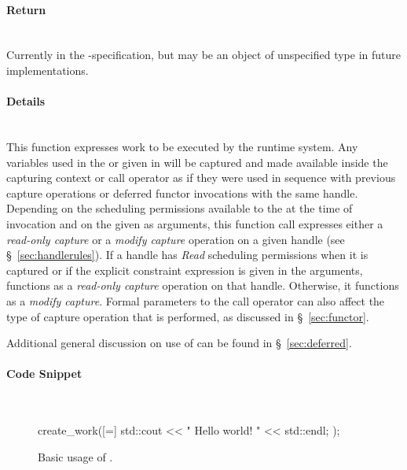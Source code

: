 \paragraph{Return}\mbox{}\\
Currently  in the \specVersion-specification, but may be an object of unspecified
type in future implementations.

\paragraph{Details}\mbox{}\\
This function expresses work to be executed by the \gls{runtime system}.  Any
 variables used in the  or
given in  will be captured and made available
inside the capturing context or  call operator as if
they were used in sequence with previous capture operations or deferred functor
invocations with the same \gls{handle}.  Depending on the scheduling permissions
available to the  at the time of
 invocation and on the 
given as arguments, this function call expresses either a {\it read-only
capture} or a {\it modify capture} operation on a given \gls{handle} (see
\S~\ref{sec:handlerules}).  If a \gls{handle}  has {\it Read} scheduling
permissions when it is captured or if the explicit constraint expression
 is given in the  arguments,
 functions as a {\it read-only capture} operation on that
\gls{handle}.
Otherwise, it functions as a {\it modify capture}.  Formal parameters to the
 call operator can also affect the type of capture
operation that is performed, as discussed in \S~\ref{sec:functor}.

Additional general discussion on use of  can be found in
\S~\ref{sec:deferred}.


\paragraph{Code Snippet}\mbox{}\\
\begin{figure}[!h]
\begin{CppCodeNumb}
create_work([=]{
  std::cout << " Hello world! " << std::endl;
});
\end{CppCodeNumb}
\label{fig:fe_api_cw}
  \caption{Basic usage of \protect{}.}
\end{figure}



